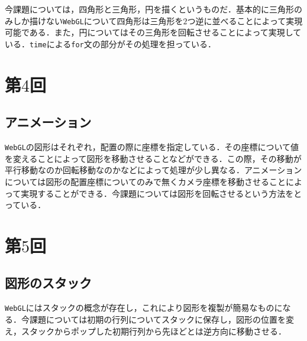 \documentclass[paper=a4, fontsize=10pt]{jlreq}
\begin{document}
今課題については，四角形と三角形，円を描くというものだ．基本的に三角形のみしか描けない\verb|WebGL|について四角形は三角形を$2$つ逆に並べることによって実現可能である．また，円についてはその三角形を回転させることによって実現している．\verb|time|による\verb|for|文の部分がその処理を担っている．

\section*{第$4$回}
\subsection*{アニメーション}
\verb|WebGL|の図形はそれぞれ，配置の際に座標を指定している．その座標について値を変えることによって図形を移動させることなどができる．この際，その移動が平行移動なのか回転移動なのかなどによって処理が少し異なる．アニメーションについては図形の配置座標についてのみで無くカメラ座標を移動させることによって実現することができる\cite{WebGL_Spec}．今課題については図形を回転させるという方法をとっている．

\section*{第$5$回}
\subsection*{図形のスタック}
\verb|WebGL|にはスタックの概念が存在し，これにより図形を複製が簡易なものになる\cite{glMatrix}．今課題については初期の行列についてスタックに保存し，図形の位置を変え，スタックからポップした初期行列から先ほどとは逆方向に移動させる．
\end{document}
